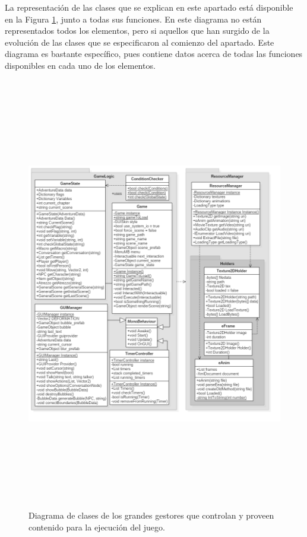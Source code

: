 La representación de las clases que se explican en este apartado está disponible en la Figura \ref{runnerbigit2}, junto a todas sus funciones. En este diagrama no están representados todos los elementos, pero si aquellos que han surgido de la evolución de las clases que se especificaron al comienzo del apartado. Este diagrama es bastante específico, pues contiene datos acerca de todas las funciones disponibles en cada uno de los elementos.

\newpage

\begin{figure}[h!]
	\centerline{\includegraphics[height=7.5in]{figures/it2/GameLogicBigOnes.png}}
	\caption[GameLogic Grandes Gestores - Versión Final]{Diagrama de clases de los grandes gestores que controlan y proveen contenido para la ejecución del juego.}
	\label{runnerbigit2}
\end{figure}

